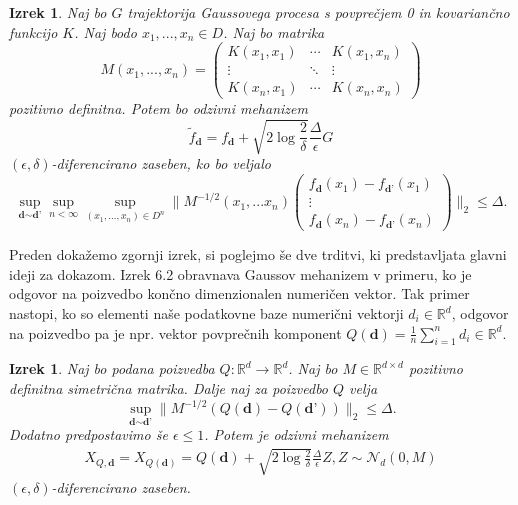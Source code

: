 \documentclass[12pt,a4paper]{amsart}
\theoremstyle{definition} %
\newtheorem{opomba}[definicija]{Opomba}
\theoremstyle{plain} %
\newtheorem{izrek}[definicija]{Izrek}
\begin{document}
\begin{izrek}
Naj bo $G$ trajektorija Gaussovega procesa s povprečjem 0 in kovariančno funkcijo $K$. Naj bodo $x_1,...,x_n \in D$. Naj bo matrika
$$
M(x_1,...,x_n) = 
 \begin{pmatrix}
  K(x_1,x_1) & \cdots & K(x_1,x_n) \\
  \vdots    & \ddots & \vdots  \\
  K(x_n,x_1) & \cdots & K(x_n,x_n) 
 \end{pmatrix}
$$
pozitivno definitna. Potem bo odzivni mehanizem 
$$
\widetilde{f}_{\textbf{d}} = f_{\textbf{d}} + \sqrt{2\log{\frac{2}{\delta}}} \frac{\Delta}{\epsilon}G
$$
$(\epsilon, \delta)$-diferencirano zaseben, ko bo veljalo
\begin{equation}\label{meja}
\sup_{\textbf{d} \sim \textbf{d'}} \sup_{n < \infty} \sup_{(x_1,...,x_n) \in D^n} 
\bigg\|M^{-1/2}(x_1,...x_n)
\begin{pmatrix}
  f_{\textbf{d}}(x_1)-f_{\textbf{d'}}(x_1)  \\
  \vdots     \\
  f_{\textbf{d}}(x_n)-f_{\textbf{d'}}(x_n)
 \end{pmatrix}
\bigg\|_2 \leq \Delta. \tag{6}
\end{equation}
\end{izrek}
Preden dokažemo zgornji izrek, si poglejmo še dve trditvi, ki predstavljata glavni ideji za dokazom. Izrek 6.2 obravnava Gaussov mehanizem v primeru, ko je odgovor na poizvedbo končno dimenzionalen numeričen vektor. Tak primer nastopi, ko so elementi naše podatkovne baze numerični vektorji $d_i \in \mathbb{R}^d$, odgovor na poizvedbo pa je  npr. vektor povprečnih komponent $Q(\textbf{d}) = \frac{1}{n} \sum_{i=1}^{n} d_i \in \mathbb{R}^d$.
\begin{izrek}
Naj bo podana poizvedba $Q: \mathbb{R}^d \rightarrow \mathbb{R}^d$. Naj bo $M \in \mathbb{R}^{d \times d}$ pozitivno definitna simetrična matrika. Dalje naj za poizvedbo $Q$ velja 
\begin{equation}\label{mejagauss}
\sup_{\textbf{d} \sim \textbf{d'}} \| M^{-1/2}(Q(\textbf{d})-Q(\textbf{d'}))\|_{2} \leq \Delta. \tag{7}
\end{equation}
Dodatno predpostavimo še $\epsilon \leq 1$. Potem je odzivni mehanizem 
\begin{gather*}
X_{Q,\textbf{d}} = X_{Q(\textbf{d})}  = Q(\textbf{d}) + \sqrt{2\log{\frac{2}{\delta}}} \frac{\Delta}{\epsilon} Z, Z \sim \mathcal{N}_d (0,M)
\end{gather*}
$(\epsilon, \delta)$-diferencirano zaseben.
\end{izrek}
\end{document}
